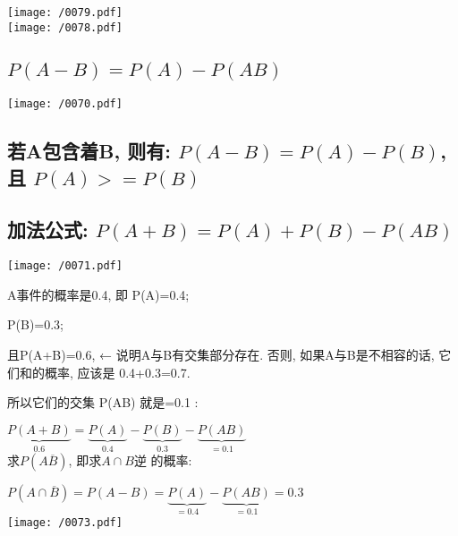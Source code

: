 \documentclass[UTF8]{ctexart}
\begin{document}
	
	\begin{myEnvSample}
	\texttt{[image: /0079.pdf]} \\
		
\texttt{[image: /0078.pdf]} 
	\end{myEnvSample}
	
	
	
	\subsection{$P(A-B) = P(A) - P(AB)$}	
		\texttt{[image: /0070.pdf]}
		
	
	\subsection{若A包含着B, 则有: $ P(A-B) = P(A) - P(B)$, 且 $P(A) >= P(B) $}
	
	
	\subsection{加法公式: $ P(A+B) = P(A) + P(B) - P(AB)$}	
	\texttt{[image: /0071.pdf]} \\
	
	\begin{myEnvSample}
		A事件的概率是0.4, 即 P(A)=0.4; 
		
		P(B)=0.3; 
		
		且P(A+B)=0.6, ← 说明A与B有交集部分存在. 否则, 如果A与B是不相容的话, 它们和的概率, 应该是 0.4+0.3=0.7.
		
		所以它们的交集 P(AB) 就是=0.1 : 
		
		$
		\underset{0.6}{\underbrace{P\left( A+B \right) }}=\underset{0.4}{\underbrace{P\left( A \right) }}-\underset{0.3}{\underbrace{P\left( B \right) }}-\underset{=0.1}{\underbrace{P\left( AB \right) }}
		$ \\
		
		求$P\left( A\overline{B} \right)$, 即求$A \cap B\text{逆}$ 的概率: 
		
$
P\left( A\cap \overline{B} \right) =P\left( A-B \right) =\underset{=0.4}{\underbrace{P\left( A \right) }}-\underset{=0.1}{\underbrace{P\left( AB \right) }}=0.3
$ \\

	\texttt{[image: /0073.pdf]}
	
		\end{myEnvSample}
	
	
	
\end{document}
